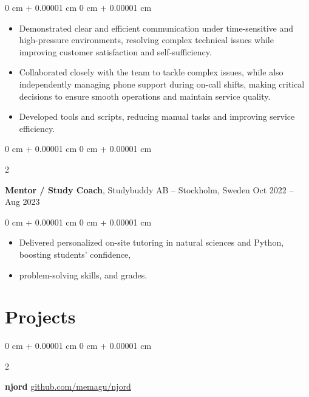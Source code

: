 \documentclass[10pt, letterpaper]{article}
\newenvironment{highlights}{
    \begin{itemize}[
        topsep=0.10 cm,
        parsep=0.10 cm,
        partopsep=0pt,
        itemsep=0pt,
        leftmargin=0 cm + 10pt
    ]
}{
    \end{itemize}
} %
\newenvironment{onecolentry}{
    \begin{adjustwidth}{
        0 cm + 0.00001 cm
    }{
        0 cm + 0.00001 cm
    }
}{
    \end{adjustwidth}
} %
\newenvironment{twocolentry}[2][]{
    \onecolentry
    \def\secondColumn{#2}
    \setcolumnwidth{\fill, 4.5 cm}
    \begin{paracol}{2}
}{
    \switchcolumn \raggedleft \secondColumn
    \end{paracol}
    \endonecolentry
} %
\begin{document}
        \vspace{0.10 cm}
        \begin{onecolentry}
            \begin{highlights}
                \item Demonstrated clear and efficient communication under time-sensitive and high-pressure environments, resolving complex technical issues while improving customer satisfaction and self-sufficiency.
                \item Collaborated closely with the team to tackle complex issues, while also independently managing phone support during on-call shifts, making critical decisions to ensure smooth operations and maintain service quality.
                \item Developed tools and scripts, reducing manual tasks and improving service efficiency.
            \end{highlights}
        \end{onecolentry}


        \vspace{0.2 cm}

        \begin{twocolentry}{
            Oct 2022 – Aug 2023
        }
            \textbf{Mentor / Study Coach}, Studybuddy AB -- Stockholm, Sweden\end{twocolentry}

        \vspace{0.10 cm}
        \begin{onecolentry}
            \begin{highlights}
                \item Delivered personalized on-site tutoring in natural sciences and Python, boosting students' confidence,
                \item problem-solving skills, and grades.
            \end{highlights}
        \end{onecolentry}



    
    \section{Projects}



        
        \begin{twocolentry}{
            \href{https://github.com/memagu/njord}{github.com/memagu/njord}
        }
            \textbf{njord}\end{twocolentry}
\end{document}
